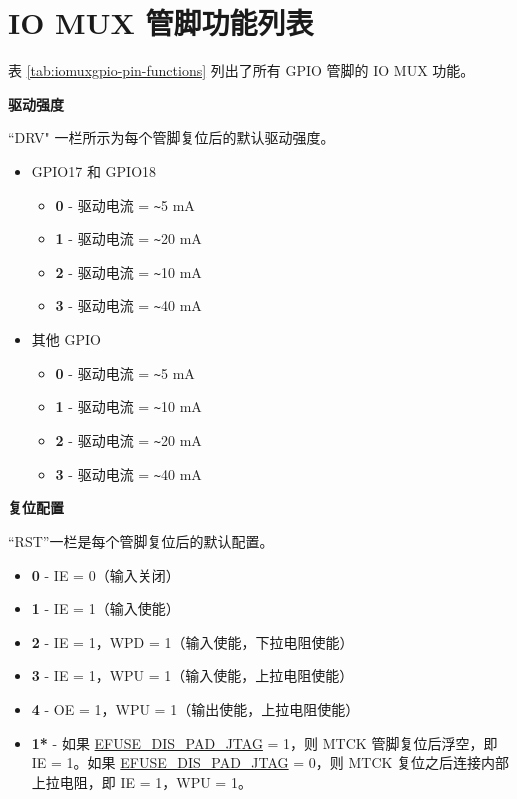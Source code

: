 \documentclass[main\_\_CN.tex]{subfiles}
\begin{document}
\begin{landscape}




\end{landscape}
\section{IO MUX 管脚功能列表}
\label{sec:iomux_pads}
表 \ref{tab:iomuxgpio-pin-functions} 列出了所有 GPIO 管脚的 IO MUX 功能。



\textbf{驱动强度}

``DRV" 一栏所示为每个管脚复位后的默认驱动强度。

\begin{itemize}
    \item GPIO17 和 GPIO18
    \begin{itemize}
        \item \textbf{0} - 驱动电流 = \verb+~+5 mA
        \item \textbf{1} - 驱动电流 = \verb+~+20 mA
        \item \textbf{2} - 驱动电流 = \verb+~+10 mA
        \item \textbf{3} - 驱动电流 = \verb+~+40 mA
    \end{itemize}
    \item 其他 GPIO
    \begin{itemize}
        \item \textbf{0} - 驱动电流 = \verb+~+5 mA
        \item \textbf{1} - 驱动电流 = \verb+~+10 mA
        \item \textbf{2} - 驱动电流 = \verb+~+20 mA
        \item \textbf{3} - 驱动电流 = \verb+~+40 mA
    \end{itemize}
\end{itemize}

\textbf{复位配置}

“RST”一栏是每个管脚复位后的默认配置。

\begin{itemize}
\item \textbf{0} - IE = 0（输入关闭）
\item \textbf{1} - IE = 1（输入使能）
\item \textbf{2} - IE = 1，WPD = 1（输入使能，下拉电阻使能）
\item \textbf{3} - IE = 1，WPU = 1（输入使能，上拉电阻使能）
\item \textbf{4} - OE = 1，WPU = 1（输出使能，上拉电阻使能）
\item \textbf{1*} - 如果 \hyperref[fielddesc:EFUSEDISPADJTAG]{EFUSE\_DIS\_PAD\_JTAG} = 1，则 MTCK 管脚复位后浮空，即 IE = 1。如果 \hyperref[fielddesc:EFUSEDISPADJTAG]{EFUSE\_DIS\_PAD\_JTAG} = 0，则 MTCK 复位之后连接内部上拉电阻，即 IE = 1，WPU = 1。
\end{itemize}
\end{document}
